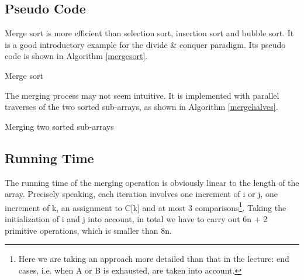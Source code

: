 \subsection{Pseudo Code}
Merge sort is more efficient than selection sort, insertion sort and bubble sort. It is  a good introductory example for the divide \& conquer paradigm. Its pseudo code is shown in Algorithm \ref{mergesort}.
\begin{algorithm}[ht]
\caption{Merge sort}\label{mergesort}
\begin{algorithmic}[1]
\Input{}
\Output{}
\EndIf
{}
\end{algorithmic}
\end{algorithm}
The merging process may not seem intuitive. It is implemented with parallel traverses of the two sorted sub-arrays, as shown in Algorithm \ref{mergehalves}.
\begin{algorithm}[ht]
\caption{Merging two sorted sub-arrays}\label{mergehalves}
\begin{algorithmic}[1]
\Input
{}
\Output{}
\Else{}
\EndIf
\EndFor
\end{algorithmic}
\end{algorithm}
\subsection{Running Time}
The running time of the merging operation is obviously linear to the length of the array. Precisely speaking, each iteration involves one increment of i or j, one increment of k, an assignment to C[k] and at most 3 comparisons\footnote{Here we are taking an approach more detailed than that in the lecture: end cases, i.e. when A or B is exhausted, are taken into account.}. Taking the initialization of i and j into account, in total we have to carry out 6n + 2 primitive operations, which is smaller than 8n.

